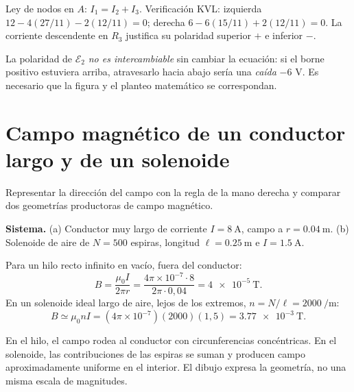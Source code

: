 \documentclass[11pt,a4paper]{article}
\newcommand{\ej}[2]{\clearpage\section{#2}}
\begin{document}
\begin{resultado}Ley de nodos en $A$: $I_1=I_2+I_3$. Verificación KVL: izquierda $12-4(27/11)-2(12/11)=0$; derecha $6-6(15/11)+2(12/11)=0$. La corriente descendente en $R_3$ justifica su polaridad superior $+$ e inferior $-$.\end{resultado}
\begin{alerta}La polaridad de $\mathcal E_2$ \emph{no es intercambiable} sin cambiar la ecuación: si el borne positivo estuviera arriba, atravesarlo hacia abajo sería una \emph{caída} $-6$ V. Es necesario que la figura y el planteo matemático se correspondan.\end{alerta}

\ej{10}{Campo magnético de un conductor largo y de un solenoide}
\begin{objetivo}Representar la dirección del campo con la regla de la mano derecha y comparar dos geometrías productoras de campo magnético.\end{objetivo}
\textbf{Sistema.} (a) Conductor muy largo de corriente $I=\SI{8}{\ampere}$, campo a $r=\SI{0.04}{\metre}$. (b) Solenoide de aire de $N=500$ espiras, longitud $\ell=\SI{0.25}{\metre}$ e $I=\SI{1.5}{\ampere}$.
\begin{center}\end{center}
\begin{metodo}
Para un hilo recto infinito en vacío, fuera del conductor:
\[B=\frac{\mu_0 I}{2\pi r}=\frac{4\pi\times10^{-7}\cdot8}{2\pi\cdot0{,}04}=\boxed{\SI{4e-5}{\tesla}}.\]
En un solenoide ideal largo de aire, lejos de los extremos, $n=N/\ell=\SI{2000}{\per\metre}$:
\[B\simeq\mu_0 nI=(4\pi\times10^{-7})(2000)(1{,}5)=\boxed{\SI{3.77e-3}{\tesla}}.\]
\end{metodo}
\begin{resultado}En el hilo, el campo rodea al conductor con circunferencias concéntricas. En el solenoide, las contribuciones de las espiras se suman y producen campo aproximadamente uniforme en el interior. El dibujo expresa la geometría, no una misma escala de magnitudes.\end{resultado}
\end{document}
